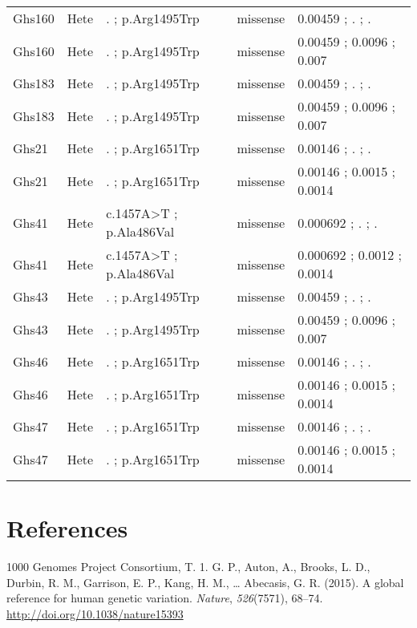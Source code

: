 \documentclass[12pt,twoside]{reedthesis}
\theoremstyle{definition}
\theoremstyle{definition}
\theoremstyle{remark}
\begin{document}
\begin{landscape}
\begin{longtable}[t]{lllll}
  Ghs160 & Hete & . ; p.Arg1495Trp & missense & 0.00459 ; . ; .\\
  \addlinespace
  Ghs160 & Hete & . ; p.Arg1495Trp & missense & 0.00459 ; 0.0096 ; 0.007\\
  Ghs183 & Hete & . ; p.Arg1495Trp & missense & 0.00459 ; . ; .\\
  Ghs183 & Hete & . ; p.Arg1495Trp & missense & 0.00459 ; 0.0096 ; 0.007\\
  Ghs21 & Hete & . ; p.Arg1651Trp & missense & 0.00146 ; . ; .\\
  Ghs21 & Hete & . ; p.Arg1651Trp & missense & 0.00146 ; 0.0015 ; 0.0014\\
  \addlinespace
  Ghs41 & Hete & c.1457A>T ; p.Ala486Val & missense & 0.000692 ; . ; .\\
  Ghs41 & Hete & c.1457A>T ; p.Ala486Val & missense & 0.000692 ; 0.0012 ; 0.0014\\
  Ghs43 & Hete & . ; p.Arg1495Trp & missense & 0.00459 ; . ; .\\
  Ghs43 & Hete & . ; p.Arg1495Trp & missense & 0.00459 ; 0.0096 ; 0.007\\
  Ghs46 & Hete & . ; p.Arg1651Trp & missense & 0.00146 ; . ; .\\
  \addlinespace
  Ghs46 & Hete & . ; p.Arg1651Trp & missense & 0.00146 ; 0.0015 ; 0.0014\\
  Ghs47 & Hete & . ; p.Arg1651Trp & missense & 0.00146 ; . ; .\\
  Ghs47 & Hete & . ; p.Arg1651Trp & missense & 0.00146 ; 0.0015 ; 0.0014\\
  \bottomrule
  \end{longtable}
  \end{landscape}
  
  \newpage
  
  \backmatter
  
  \chapter*{References}\label{references}
  
  \noindent
  
  \setlength{\parindent}{-0.20in} \setlength{\leftskip}{0.20in}
  \setlength{\parskip}{8pt}
  
  \hypertarget{refs}{}
  \hypertarget{ref-1000GenomesProjectConsortium2015}{}
  1000 Genomes Project Consortium, T. 1. G. P., Auton, A., Brooks, L. D.,
  Durbin, R. M., Garrison, E. P., Kang, H. M., \ldots{} Abecasis, G. R.
  (2015). A global reference for human genetic variation. \emph{Nature},
  \emph{526}(7571), 68--74. \url{http://doi.org/10.1038/nature15393}
  
\end{document}
